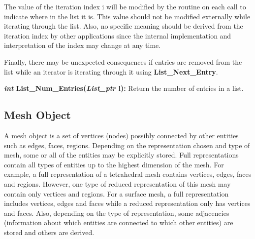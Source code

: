 \documentclass[12pt]{article}
\begin{document}
\begin{description}
The value of the iteration index i will be modified by the routine on
each call to indicate where in the list it is. This value should not be
modified externally while iterating through the list. Also, no specific
meaning should be derived from the iteration index by other applications
since the internal implementation and interpretation of the index may
change at any time.

Finally, there may be unexpected consequences if entries are removed
from the list while an iterator is iterating through it using {\bf
  List\_Next\_Entry}.

\item[]{\bf {\em int} List\_Num\_Entries({\em List\_ptr} l):} Return
the number of entries in a list.
\end{description}

\newpage
\subsection{Mesh Object}

A mesh object is a set of vertices (nodes) possibly connected by other
entities such as edges, faces, regions. Depending on the
representation chosen and type of mesh, some or all of the entities
may be explicitly stored.  Full representations contain all types of
entities up to the highest dimension of the mesh. For example, a full
representation of a tetrahedral mesh contains vertices, edges, faces
and regions. However, one type of reduced representation of this mesh
may contain only vertices and regions. For a surface mesh, a full
representation includes vertices, edges and faces while a reduced
representation only has vertices and faces. Also, depending on the
type of representation, some adjacencies (information about which
entities are connected to which other entities) are stored and others
are derived.
\end{document}
